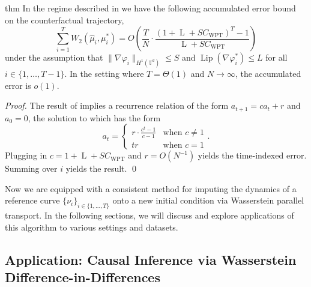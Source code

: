 \documentclass[11pt]{article}
\begin{document}
\begin{restatable}{thm}{} \label{full cf approximation error}
    In the regime described in  we have the following accumulated error bound on the counterfactual trajectory,
    \[\sum_{i = 1}^TW_2(\hat{\mu}_i, \mu_i^*) = O\left(\frac{T}{N}\cdot \frac{( 1 + \operatorname{L} + SC_{\text{WPT}}) ^T - 1}{\operatorname{L} + SC_{\text{WPT}} }\right) \]
    under the assumption that $\|\nabla \varphi_i\|_{H^1(\mathbb{T}^d)} \leq S $ and $\operatorname{Lip}(\nabla \varphi_i^*) \leq L$ for all $i \in \{1, \dots, T-1\}$. In the setting where $T = \Theta(1)$ and $N \rightarrow \infty$, the accumulated error is $o(1)$. 
\end{restatable}
\noindent \textit{Proof.} The result of  implies a recurrence relation of the form $a_{t+1} = ca_t + r$ and $a_0 = 0$, the solution to which has the form 
\[a_t = \begin{cases}
    r\cdot \frac{c^t - 1}{c - 1} & \text{when $c \neq 1$} \\
    tr &  \text{when $c = 1$}
\end{cases}.\]
Plugging in $c = 1 + \operatorname{L} + SC_{\text{WPT}}$ and $r = O(N^{-1})$ yields the time-indexed error. Summing over $i$ yields the result.
\qed{}

Now we are equipped with a consistent method for imputing the dynamics of a reference curve $\{\nu_i\}_{i \in \{1, \dots, T\}}$ onto a new initial condition via Wasserstein parallel transport. In the following sections, we will discuss and explore applications of this algorithm to various settings and datasets. 


\subsection{Application: Causal Inference via  Wasserstein Difference-in-Differences}
\end{document}
